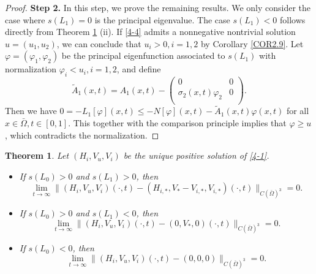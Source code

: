 \documentclass[11pt,reqno]{amsart}
\newtheorem{theorem}{Theorem}[section]
\numberwithin{equation}{section}
\begin{document}
\begin{proof}
{\bf Step 2.} In this step, we prove the remaining results. We only consider the case where $s(L_{1})=0$ is the principal eigenvalue. The case $s(L_{1})<0$ follows directly from Theorem \ref{th6.11} (ii).
If \eqref{4-4} admits a nonnegative nontrivial solution $u=(u_{1},u_{2})$, we can conclude that $u_{i}>0, i=1,2$ by Corollary \ref{COR2.9}.
Let $\varphi=(\varphi_{1},\varphi_{2})$ be the principal eigenfunction associated to $s(L_{1})$ with normalization $\varphi_{i} < u_{i}, i=1,2$, and define
\begin{equation*}
\tilde{A}_{1}(x,t)= A_{1}(x,t) -
\left(
\begin{array}{cc}
0 &  0\\
\sigma_{2}(x,t)  \varphi_{2} &  0\\
\end{array} \right).
\end{equation*}
Then we have $0=- L_{1}[\varphi](x,t)\leq -N[\varphi](x,t) - \tilde{A}_{1}(x,t)\varphi(x,t)$ for all $x\in\bar{\Omega},t\in[0,1]$. This together with the comparison principle implies that $\varphi \geq u$, which contradicts the normalization.

\end{proof}




\begin{theorem}\label{th6.11}
Let $(H_{i},V_{u},V_{i})$ be the unique positive solution of \eqref{4-1}.
\begin{itemize}[leftmargin=0.9cm]
\item[(i)] If $s(L_{0})>0$ and $s(L_{1})>0$, then
\begin{equation*}
\lim\limits_{t\to\infty} \| (H_{i},V_{u},V_{i})(\cdot,t) -(H_{i,*},V_{*}-V_{i,*},V_{i,*})(\cdot,t)\|_{{C(\bar{\Omega})}^{3}} = 0.
\end{equation*}


\item[(ii)] If $s(L_{0})>0$ and $s(L_{1})<0$, then
\begin{equation*}
\lim\limits_{t\to\infty} \| (H_{i},V_{u},V_{i})(\cdot,t) - (0,V_{*},0)(\cdot,t)\|_{{C(\bar{\Omega})}^{3}} = 0.
\end{equation*}


\item[(iii)] If $s(L_{0})<0$, then
\begin{equation*}
\lim\limits_{t\to\infty} \| (H_{i},V_{u},V_{i})(\cdot,t) - (0,0,0)\|_{{C(\bar{\Omega})}^{3}} = 0.
\end{equation*}
\end{itemize}
\end{theorem}
%
\end{document}
